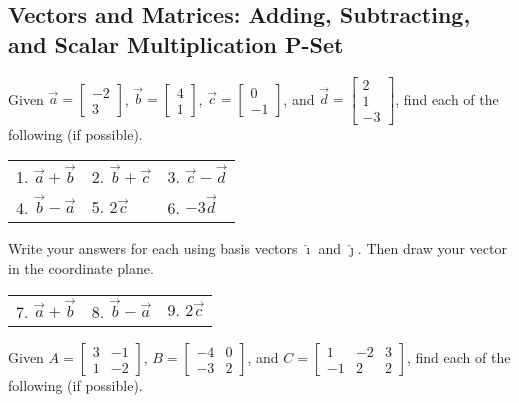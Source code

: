 \documentclass{article}
\begin{document}
\subsection*{Vectors and Matrices: Adding, Subtracting, and Scalar Multiplication P-Set}

Given $\vec{a} = \begin{bmatrix} -2 \\ 3 \end{bmatrix}$, $\vec{b} = \begin{bmatrix} 4 \\ 1 \end{bmatrix}$, $\vec{c} = \begin{bmatrix} 0 \\ -1 \end{bmatrix}$, and $\vec{d} = \begin{bmatrix} 2 \\ 1 \\ -3 \end{bmatrix}$, find each of the following (if possible).    \newline\\

\begin{tabular}{p{}p{}p{}}
1. \quad $\vec{a} + \vec{b}$    &
2. \quad $\vec{b} + \vec{c}$    &
3. \quad $\vec{c} - \vec{d}$      \\[10pt]
4. \quad $\vec{b} - \vec{a}$    &
5. \quad $2\vec{c}$             &
6. \quad $-3\vec{d}$            \\[10pt]
\end{tabular}


Write your answers for each using basis vectors $\hat{\imath}$ and $\hat{\jmath}$. Then draw your vector in the coordinate plane. \newline\\

\begin{tabular}{p{}p{}p{}}
7. \quad $\vec{a} + \vec{b}$    &
8. \quad $\vec{b} - \vec{a}$    &
9. \quad $2\vec{c}$             \\[15pt]
\end{tabular}

Given $A = \begin{bmatrix} 3 & -1 \\ 1 & -2 \end{bmatrix}$, $B = \begin{bmatrix} -4 & 0 \\ -3 & 2 \end{bmatrix}$, and $C = \begin{bmatrix} 1 & -2 & 3 \\ -1 & 2 & 2 \end{bmatrix}$, find each of the following (if possible).  \\[0.2in]
\end{document}
